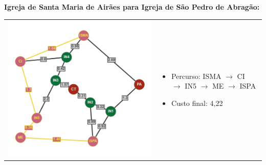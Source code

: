 \documentclass[12pt]{article}
\begin{document}
    \noindent \textbf{Igreja de Santa Maria de Airães para Igreja de São Pedro de Abragão:}\\
    \begin{tabular}{@{}m{}m{}@{}}
      \centering\includegraphics[scale=0.4]{anexos/ISMA-ISPA.png} &
      \begin{itemize}
        \item Percurso: ISMA $\rightarrow$ CI $\rightarrow$ IN5 $\rightarrow$ ME $\rightarrow$ ISPA
        \item Custo final: 4,22
      \end{itemize}
    \end{tabular} 
    
    \newpage
    
\end{document}
